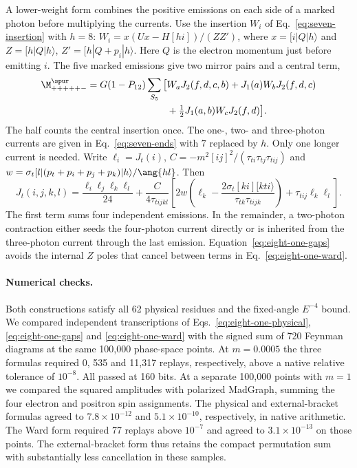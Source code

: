 A lower-weight form combines the positive emissions on each side of a
marked photon before multiplying the currents. Use the insertion
$W_i$ of Eq.~\eqref{eq:seven-insertion} with $h=8$:
$W_i=x(Ux-H[hi])/(ZZ')$, where $x=[i|Q|h\rangle$ and
$Z=[h|Q|h\rangle$, $Z'=[h|Q+p_i|h\rangle$. Here $Q$ is the
electron momentum just before emitting $i$. The five marked emissions
give two mirror pairs and a central term,
\begin{equation}\label{eq:eight-one-ward}
\begin{aligned}
 \M^{\spur}_{+++++-}=G(1-P_{12})\sum_{S_5}\big[&
 W_a J_2(f,d,c,b)+J_1(a)W_bJ_2(f,d,c)\\
 &+\tfrac12 J_1(a,b)W_c J_2(f,d)\big].
\end{aligned}
\end{equation}
The half counts the central insertion once. The one-, two- and three-photon
currents are given in Eq.~\eqref{eq:seven-ends} with $7$ replaced by $h$.
Only one longer current is needed. Write $\ell_i=J_t(i)$,
$C=-m^2[ij]^2/(\tau_{ti}\tau_{tj}\tau_{tij})$ and
$w=\sigma_t[l|(p_t+p_i+p_j+p_k)|h\rangle/\ang{hl}$. Then
\begin{equation}\label{eq:eight-one-tail}
 J_t(i,j,k,l)=\frac{\ell_i\ell_j\ell_k\ell_l}{24}
 +\frac{C}{4\tau_{tijkl}}\left[
  2w\left(\ell_k-\frac{2\sigma_t[ki][kti\rangle}{\tau_{tk}\tau_{tijk}}\right)
     +\tau_{tij}\ell_k\ell_l\right].
\end{equation}
The first term sums four independent emissions. In the remainder, a
two-photon contraction either seeds the four-photon current directly or
is inherited from the three-photon current through the last emission.
Equation~\eqref{eq:eight-one-gaps} avoids the internal $Z$ poles that
cancel between terms in Eq.~\eqref{eq:eight-one-ward}.

\paragraph{Numerical checks.}
Both constructions satisfy all 62 physical residues and the fixed-angle
$E^{-4}$ bound. We compared independent transcriptions of
Eqs.~\eqref{eq:eight-one-physical}, \eqref{eq:eight-one-gaps}
and \eqref{eq:eight-one-ward} with the signed sum of 720 Feynman
diagrams at the same 100,000 phase-space points. At $m=0.0005$ the
three formulas required 0, 535 and 11,317 replays, respectively, above
a native relative tolerance of $10^{-8}$. All passed at 160 bits.
At a separate 100,000 points with $m=1$ we compared the squared
amplitudes with polarized MadGraph, summing the four electron and positron
spin assignments. The physical and external-bracket formulas agreed to
$7.8\times10^{-12}$ and $5.1\times10^{-10}$, respectively, in native
arithmetic. The Ward form required 77 replays above $10^{-7}$ and agreed
to $3.1\times10^{-13}$ on those points. The external-bracket form thus
retains the compact permutation sum with substantially less cancellation
in these samples.
